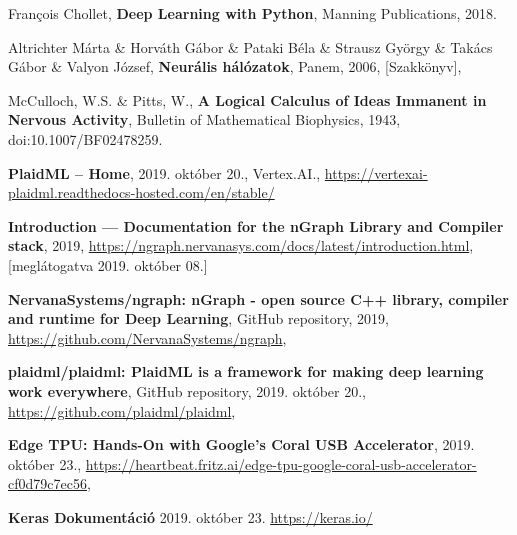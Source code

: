 \begin{thebibliography}{9}
	François Chollet,
	\textbf{Deep Learning with Python},
	Manning Publications,
	2018.

	Altrichter Márta \& Horváth Gábor \& Pataki Béla \& Strausz György \& Takács Gábor \& Valyon József,
	\textbf{Neurális hálózatok},
	Panem,
	2006,
	[Szakkönyv],

McCulloch, W.S. \& Pitts, W.,
\textbf{A Logical Calculus of Ideas Immanent in Nervous Activity},
Bulletin of Mathematical Biophysics,
1943,
doi:10.1007/BF02478259.




\textbf{PlaidML -- Home},
2019. október 20.,
Vertex.AI.,
\newline\url{https://vertexai-plaidml.readthedocs-hosted.com/en/stable/}

\textbf{Introduction --- Documentation for the {nGraph} Library and Compiler stack},
2019,
\newline\url{https://ngraph.nervanasys.com/docs/latest/introduction.html},
[meglátogatva 2019. október 08.]


	\textbf{NervanaSystems/ngraph: nGraph - open source C++ library, compiler and runtime for Deep Learning},
	GitHub repository,
	2019,
	\newline\url{https://github.com/NervanaSystems/ngraph},

	\textbf{plaidml/plaidml: PlaidML is a framework for making deep learning work everywhere},
	GitHub repository,
	2019. október 20.,
	\newline\url{https://github.com/plaidml/plaidml},

	\textbf{Edge TPU: Hands-On with Google’s Coral USB Accelerator},
	2019. október 23.,
	\newline\url{https://heartbeat.fritz.ai/edge-tpu-google-coral-usb-accelerator-cf0d79c7ec56},

	\textbf{Keras Dokumentáció}
	2019. október 23.
	\newline\url{https://keras.io/}
	

\end{thebibliography}
